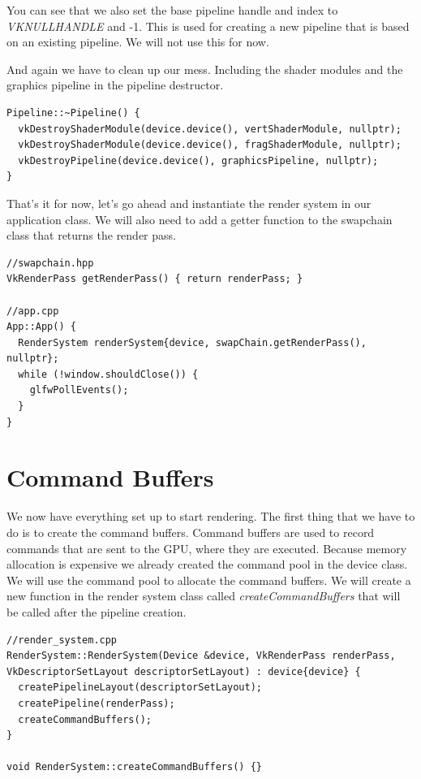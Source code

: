 \documentclass[12pt]{report} \usepackage{preamble}
\begin{document}
You can see that we also set the base pipeline handle and index to \textit{VK\textunderscore NULL\textunderscore HANDLE}
and -1. This is used for creating a new pipeline that is based on an existing pipeline. We will not use this for now.

And again we have to clean up our mess. Including the shader modules and the graphics pipeline in the pipeline destructor.

\begin{lstlisting}[Language=C++]
Pipeline::~Pipeline() {
  vkDestroyShaderModule(device.device(), vertShaderModule, nullptr);
  vkDestroyShaderModule(device.device(), fragShaderModule, nullptr);
  vkDestroyPipeline(device.device(), graphicsPipeline, nullptr);
}
\end{lstlisting}

That's it for now, let's go ahead and instantiate the render system in our application class.
We will also need to add a getter function to the swapchain class that returns the render pass.

\begin{lstlisting}[Language=C++]
//swapchain.hpp
VkRenderPass getRenderPass() { return renderPass; }

//app.cpp
App::App() {
  RenderSystem renderSystem{device, swapChain.getRenderPass(), nullptr};
  while (!window.shouldClose()) {
    glfwPollEvents();
  }
}
\end{lstlisting}

\section{Command Buffers}

We now have everything set up to start rendering. The first thing that we have to do is to create the command buffers.
Command buffers are used to record commands that are sent to the GPU, where they are executed. Because memory allocation
is expensive we already created the command pool in the device class. We will use the command pool to allocate the command
buffers. We will create a new function in the render system class called \textit{createCommandBuffers} that will be called
after the pipeline creation.

\begin{lstlisting}[Language=C++]
//render_system.cpp
RenderSystem::RenderSystem(Device &device, VkRenderPass renderPass, VkDescriptorSetLayout descriptorSetLayout) : device{device} {
  createPipelineLayout(descriptorSetLayout);
  createPipeline(renderPass);
  createCommandBuffers();
}

void RenderSystem::createCommandBuffers() {}
\end{lstlisting}
\end{document}

